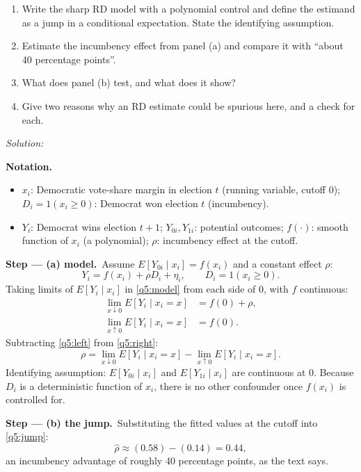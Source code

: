 \documentclass[11pt,a4paper]{article}
\newif\ifsolucoes
\newcommand{\espacoresol}{4.5cm}   %
\newenvironment{notacao}{\par\smallskip\noindent\textbf{Notation.}\begin{itemize}[leftmargin=1.4em,topsep=1pt,itemsep=0pt]\small}{\end{itemize}}
\newcommand{\resolespaco}{\ifsolucoes\else\par\textit{Solution:}\vspace{\espacoresol}\par\fi}
\newcommand{\passo}[2]{\par\smallskip\noindent\textbf{Step --- #1.}~#2}
\begin{document}
\begin{enumerate}[label=(\alph*)]
\item Write the sharp RD model with a polynomial control and define the estimand as a jump in a
conditional expectation. State the identifying assumption.
\item Estimate the incumbency effect from panel (a) and compare it with ``about 40 percentage points''.
\item What does panel (b) test, and what does it show?
\item Give two reasons why an RD estimate could be spurious here, and a check for each.
\end{enumerate}
\resolespaco
\begin{sol}
\begin{notacao}
\item $x_i$: Democratic vote-share margin in election $t$ (running variable, cutoff $0$);
$D_i=1(x_i\geq0)$: Democrat won election $t$ (incumbency).
\item $Y_i$: Democrat wins election $t+1$; $Y_{0i},Y_{1i}$: potential outcomes; $f(\cdot)$: smooth
function of $x_i$ (a polynomial); $\rho$: incumbency effect at the cutoff.
\end{notacao}

\passo{(a) model}{Assume $E[Y_{0i}\mid x_i]=f(x_i)$ and a constant effect $\rho$:
\begin{equation}
Y_i=f(x_i)+\rho D_i+\eta_i,\qquad D_i=1(x_i\geq0).\label{q5:model}
\end{equation}
Taking limits of $E[Y_i\mid x_i]$ in \eqref{q5:model} from each side of $0$, with $f$ continuous:
\begin{align}
\lim_{x\downarrow0}E[Y_i\mid x_i=x]&=f(0)+\rho,\label{q5:right}\\
\lim_{x\uparrow0}E[Y_i\mid x_i=x]&=f(0).\label{q5:left}
\end{align}
Subtracting \eqref{q5:left} from \eqref{q5:right}:
\begin{equation}
\rho=\lim_{x\downarrow0}E[Y_i\mid x_i=x]-\lim_{x\uparrow0}E[Y_i\mid x_i=x].\label{q5:jump}
\end{equation}
Identifying assumption: $E[Y_{0i}\mid x_i]$ and $E[Y_{1i}\mid x_i]$ are continuous at $0$. Because $D_i$ is
a deterministic function of $x_i$, there is no other confounder once $f(x_i)$ is controlled for.}

\passo{(b) the jump}{Substituting the fitted values at the cutoff into \eqref{q5:jump}:
\begin{equation}
\hat\rho\approx(0.58)-(0.14)=0.44,\label{q5:est}
\end{equation}
an incumbency advantage of roughly 40 percentage points, as the text says.}


\end{sol}
\end{document}

